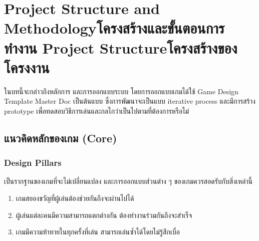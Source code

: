 \chapter{\ifproject%
\ifenglish Project Structure and Methodology\else โครงสร้างและขั้นตอนการทำงาน\fi
\else%
\ifenglish Project Structure\else โครงสร้างของโครงงาน\fi
\fi
}

ในบทนี้จะกล่าวถึงหลักการ และการออกแบบระบบ โดยการออกแบบเกมได้ใช้ Game Design Template Master Doc \cite{GDD1, GDD2} เป็นต้นแบบ ซึ่งการพัฒนาจะเป็นแบบ iterative process และมีการสร้าง prototype เพื่อทดสอบวิธีการเล่นและกลไกว่าเป็นไปตามที่ต้องการหรือไม่

\makeatletter


\makeatother

\section{แนวคิดหลักของเกม (Core)}

\subsection{Design Pillars}

เป็นรากฐานของเกมที่จะไม่เปลี่ยนแปลง และการออกแบบส่วนต่าง ๆ ของเกมควรสอดรับกับสิ่งเหล่านี้ \cite{GDD1}

\begin{enumerate}
  \item เกมสยองขวัญที่ผู้เล่นต้องช่วยกันถึงจะผ่านไปได้
  \item ผู้เล่นแต่ละคนมีความสามารถแตกต่างกัน ต้องทำงานร่วมกันถึงจะสำเร็จ
  \item เกมมีความท้าทายในทุกครั้งที่เล่น สามารถเล่นซ้ำได้โดยไม่รู้สึกเบื่อ
\end{enumerate}

